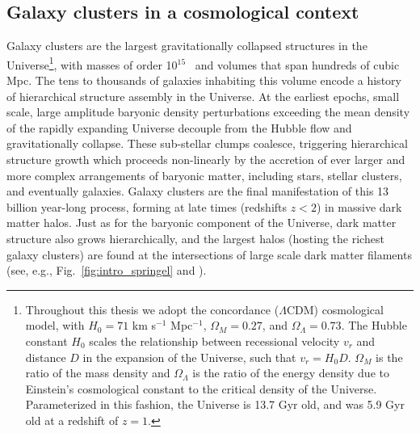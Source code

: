 \subsection{Galaxy clusters in a cosmological context}




Galaxy clusters are the largest gravitationally collapsed structures in the
Universe\footnote{Throughout this thesis we adopt 
the concordance ($\Lambda$CDM) cosmological model, with 
$H_0   = 71$  km
s$^{-1}$  Mpc$^{-1}$,   $\Omega_M  =   0.27$,  and $\Omega_{\Lambda} = 0.73$.
The Hubble constant $H_0$ scales the relationship between recessional velocity
$v_r$ and distance $D$ in the expansion of the Universe, such that $v_r=H_0 D$. $\Omega_M$ 
is the ratio of the mass density and  $\Omega_{\Lambda}$
is the ratio of the energy density due to Einstein's cosmological constant to the 
critical density of the Universe. Parameterized in this fashion, the Universe is 13.7 Gyr old, and was 5.9 Gyr old at a redshift of $z=1$.}, with masses of order  10$^{15}$ \Msol\ and volumes that span hundreds
of cubic Mpc. The tens to thousands of galaxies inhabiting this volume encode a history 
of hierarchical structure assembly in the Universe. 
At the earliest epochs, small scale,
large amplitude baryonic density perturbations exceeding the mean density of the rapidly
expanding Universe decouple from the Hubble flow and gravitationally collapse.
These sub-stellar clumps coalesce, triggering hierarchical structure growth
which proceeds non-linearly by the accretion of ever larger and more complex
arrangements of baryonic matter, including stars, stellar clusters, and eventually galaxies.  
Galaxy clusters are the final manifestation
of this 13 billion year-long process, forming at late times (redshifts $z <
2$) in massive dark matter halos. 
Just as for the baryonic component of the Universe, dark matter structure also grows hierarchically, 
and the largest halos (hosting the richest galaxy clusters) are found at the intersections 
of large scale dark matter filaments 
(see, e.g.,
Fig.~\ref{fig:intro_springel} and \citealt{springel05}).



